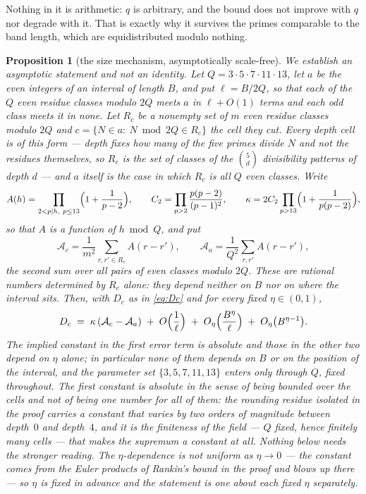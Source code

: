 \documentclass[11pt,a4paper]{article}
\theoremstyle{plain}
\newtheorem{proposition}[theorem]{Proposition}
\theoremstyle{definition}
\theoremstyle{remark}
\begin{document}
Nothing in it is arithmetic: $q$ is arbitrary, and the bound does not
improve with $q$ nor degrade with it. That is exactly why it survives
the primes comparable to the band length, which are equidistributed
modulo nothing.

\begin{proposition}[the size mechanism, asymptotically scale-free]%
\label{prop:scaleinv}
We establish an asymptotic statement and not an identity. Let
$Q=3\cdot5\cdot7\cdot11\cdot13$, let $a$ be the even integers of an
interval of length $B$, and put $\ell=B/2Q$, so that each of the $Q$
\emph{even} residue classes modulo $2Q$ meets $a$ in $\ell+O(1)$ terms
and each odd class meets it in none. Let $R_c$ be a
nonempty set of $m$ even residue classes modulo $2Q$ and
$c=\{N\in a:\ N\bmod 2Q\in R_c\}$ the cell they cut. Every depth cell
is of this form --- depth fixes how many of the five primes divide
$N$ and not the residues themselves, so $R_c$ is the set of classes
of the $\binom{5}{d}$ divisibility patterns of depth $d$ --- and $a$
itself is the case in which $R_c$ is all $Q$ even classes. Write
\[
  A(h)=\prod_{2<p\mid h,\ p\le13}\Bigl(1+\frac1{p-2}\Bigr),
  \qquad
  C_2=\prod_{p>2}\frac{p(p-2)}{(p-1)^2},
  \qquad
  \kappa=2C_2\prod_{p>13}\Bigl(1+\frac1{p(p-2)}\Bigr),
\]
so that $A$ is a function of $h\bmod Q$, and put
\[
  \mathcal A_c=\frac1{m^2}\sum_{r,r'\in R_c}A(r-r'),
  \qquad
  \mathcal A_a=\frac1{Q^2}\sum_{r,r'}A(r-r'),
\]
the second sum over all pairs of even classes modulo $2Q$. These are
rational numbers determined by $R_c$ alone: they depend neither on
$B$ nor on where the interval sits. Then, with $D_c$ as in
\eqref{eq:Dc} and for every fixed $\eta\in(0,1)$,
\begin{equation}\label{eq:scaleinv}
  D_c\;=\;\kappa\,(\mathcal A_c-\mathcal A_a)
  \;+\;O\Bigl(\frac1\ell\Bigr)
  \;+\;O_\eta\Bigl(\frac{B^{\eta}}{\ell}\Bigr)
  \;+\;O_\eta\bigl(B^{\eta-1}\bigr).
\end{equation}
The implied constant in the first error term is absolute and those in
the other two depend on $\eta$ alone; in particular none of them
depends on $B$ or on the position of the interval, and the parameter
set $\{3,5,7,11,13\}$ enters only through $Q$, fixed throughout. The
first constant is absolute in the sense of being bounded over the cells
and not of being one number for all of them: the rounding residue
isolated in the proof carries a constant that varies by two orders of
magnitude between depth~$0$ and depth~$4$, and it is the finiteness of
the field --- $Q$ fixed, hence finitely many cells --- that makes the
supremum a constant at all. Nothing below needs the stronger reading. The $\eta$-dependence is not uniform as
$\eta\to0$ --- the constant comes from the Euler products of Rankin's
bound in the proof and blows up there --- so $\eta$ is fixed in
advance and the statement is one about each fixed $\eta$ separately.


\end{proposition}
\end{document}
